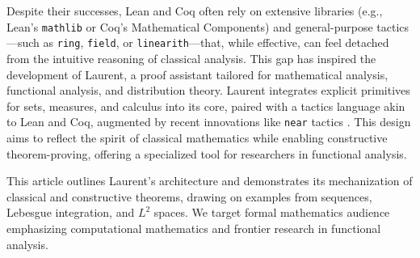 \documentclass{article}
\begin{document}
Despite their successes, Lean and Coq often rely on extensive libraries (e.g., Lean’s \texttt{mathlib}
or Coq’s Mathematical Components) and general-purpose tactics—such as \texttt{ring}, \texttt{field},
or \texttt{linearith}—that, while effective, can feel detached
from the intuitive reasoning of classical analysis. This gap has
inspired the development of Laurent, a proof assistant tailored
for mathematical analysis, functional analysis, and distribution theory.
Laurent integrates explicit primitives for sets, measures, and calculus
into its core, paired with a tactics language akin to Lean and Coq, augmented
by recent innovations like \texttt{near} tactics \cite{af18}. This design aims
to reflect the spirit of classical mathematics while enabling constructive
theorem-proving, offering a specialized tool for researchers in functional analysis.

This article outlines Laurent’s architecture and demonstrates its mechanization
of classical and constructive theorems, drawing on examples from sequences,
Lebesgue integration, and $L^2$ spaces. We target formal mathematics audience
emphasizing computational mathematics and frontier research in functional analysis.
\end{document}
